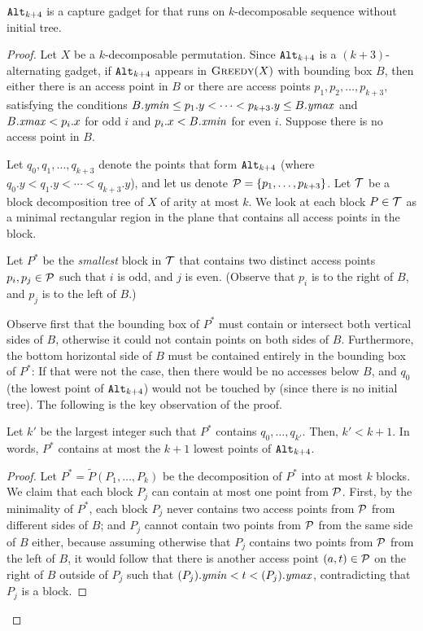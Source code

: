 \begin{lemma}
	 $\texttt{Alt}_{k+4}$ is a capture gadget for \greedy that runs on $k$-decomposable
		sequence without initial tree.
 
\end{lemma}

\begin{proof}

Let $X$ be a $k$-decomposable permutation.
Since $\texttt{Alt}_{k+4}$ is a $(k+3)$-alternating gadget, if $\texttt{Alt}_{k+4}$ appears in $\textsc{Greedy}(X)$ with bounding box $B$, then either there is an access point in $B$ or there are access points $p_1, p_2, \dots, p_{k+3}$, satisfying the conditions $B.\mathit{ymin} \leq p_1.y < \cdots < p_{k+3}.y \leq B.\mathit{ymax}$ and $B.\mathit{xmax} < p_i.x$ for odd $i$ and $p_i.x < B.\mathit{xmin}$ for even $i$. Suppose there is no access point in $B$.


Let $q_0, q_1, \dots, q_{k+3}$ denote the points that form $\texttt{Alt}_{k+4}$ (where $q_0.y < q_1.y < \cdots < q_{k+3}.y$), and let us denote ${\mathcal{P}} = \{p_1, \dots, p_{k+3}\}$. Let ${\mathcal T}$ be a block decomposition tree of $X$ of arity at most $k$. We look at each block $P \in {\mathcal T}$ as a minimal rectangular region in the plane that contains all access points in the block. 

Let $P^*$ be the \emph{smallest} block in ${\mathcal T}$ that contains two distinct access points $p_i, p_j \in {\mathcal{P}}$ such that $i$ is odd, and $j$ is even. (Observe that $p_i$ is to the right of $B$, and $p_j$ is to the left of $B$.) 

Observe first that the bounding box of $P^*$ must contain or intersect both vertical sides of $B$, otherwise it could not contain points on both sides of $B$. 
Furthermore, the bottom horizontal side of $B$ must be contained entirely in the bounding box of $P^*$: If that were not the case, then there would be no accesses below $B$, and $q_0$ (the lowest point of $\texttt{Alt}_{k+4}$) would not be touched by \greedy (since there is no initial tree).
The following is the key observation of the proof.

\begin{lemma}
\label{lem:d5}
Let $k'$ be the largest integer such that $P^*$ contains $q_0, \dots, q_{k'}$. Then, $k' < k+1$. In words, $P^*$ contains at most the $k+1$ lowest points of $\texttt{Alt}_{k+4}$.
\end{lemma}

\begin{proof}
Let $P^* = \tilde P(P_1,\ldots, P_k)$ be the decomposition of $P^*$ into at most $k$ blocks.
We claim that each block $P_j$ can contain at most one point from ${\mathcal{P}}$. First, by the minimality of $P^*$, each block $P_j$ never contains two access points from ${\mathcal{P}}$ from different sides of $B$; and $P_j$ cannot contain two points from ${\mathcal{P}}$ from the same side of $B$ either, because assuming otherwise that $P_j$ contains two points from ${\mathcal{P}}$ from the left of $B$, it would follow that there is another access point $(a,t) \in {\mathcal{P}}$ on the right of $B$ outside of $P_j$ such that $(P_j).\mathit{ymin} < t< (P_j).\mathit{ymax}$, contradicting that $P_j$ is a block.  


\end{proof}
\end{proof}
